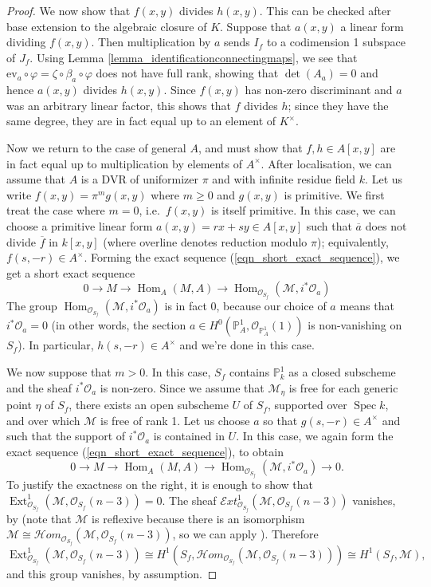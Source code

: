 \documentclass{article} %
\numberwithin{equation}{section}
\DeclareMathOperator{\Hom}{Hom}
\DeclareMathOperator{\Ext}{Ext}
\DeclareMathOperator{\Spec}{Spec}
\newcommand{\bbP}{\mathbb{P}}
\newcommand{\cO}{\mathcal{O}}
\newcommand{\cM}{\mathcal{M}}
\newcommand{\ShHom}{\mathcal{H}\!\mathit{om}}
\begin{document}
\begin{proof}
    We now show that $f(x, y)$ divides $h(x, y)$. This can be checked after base extension to the algebraic closure of $K$. Suppose that $a(x, y)$ a linear form dividing $f(x, y)$. Then multiplication by $a$ sends $I_f$ to a codimension 1 subspace of $J_f$. Using Lemma \ref{lemma_identificationconnectingmaps}, we see that $\mathrm{ev}_a \circ \varphi = \zeta \circ \beta_a \circ \varphi$ does not have full rank, showing that $\det(A_a) = 0$ and hence $a(x, y)$ divides $h(x, y)$. Since $f(x, y)$ has non-zero discriminant and $a$ was an arbitrary linear factor, this shows that $f$ divides $h$; since they have the same degree, they are in fact equal up to an element of $K^{\times}$.

    Now we return to the case of general $A$, and must show that $f, h \in A[x, y]$ are in fact equal up to multiplication by elements of $A^\times$. After localisation, we can assume that $A$ is a DVR of uniformizer $\pi$ and with infinite residue field $k$. Let us write $f(x, y) = \pi^m g(x, y)$ where $m \geq 0$ and $g(x, y)$ is primitive. We first treat the case where $m = 0$, i.e.\ $f(x, y)$ is itself primitive. In this case,  we can choose a primitive linear form $a(x, y) = r x + s y \in A[x, y]$ such that $\overline{a}$ does not divide $\overline{f}$ in $k[x, y]$ (where overline denotes reduction modulo $\pi$); equivalently, $f(s, -r) \in A^\times$. Forming the exact sequence (\ref{eqn_short_exact_sequence}), we get a short exact sequence
    \[ 0 \to M \to \Hom_A(M, A) \to \Hom_{\cO_{S_f}}(\cM, i^\ast \cO_a)  \]
    The group $\Hom_{\cO_{S_f}}(\cM, i^\ast \cO_a)$ is in fact $0$, because our choice of $a$ means that $i^\ast \cO_a = 0$ (in other words, the section $a \in H^0(\bbP^1_A, \cO_{\bbP^1_A}(1))$ is non-vanishing on $S_f$). In particular, $h(s, -r) \in A^\times$ and we're done in this case. 

    We now suppose that $m > 0$. In this case, $S_f$ contains $\bbP^1_k$ as a closed subscheme and the sheaf $i^\ast \cO_a$ is non-zero. Since we assume that $\cM_\eta$ is free for each generic point $\eta$ of $S_f$, there exists an open subscheme $U$ of $S_f$, supported over $\Spec k$, and over which $\cM$ is free of rank 1. Let us choose $a$ so that $g(s, -r) \in A^\times$ and such that the support of $i^\ast \cO_a$ is contained in $U$. In this case, we again form the exact sequence (\ref{eqn_short_exact_sequence}), to obtain 
    \[ 0 \to M \to \Hom_A(M, A) \to \Hom_{\cO_{S_f}}(\cM, i^\ast \cO_a) \to 0.  \]
    To justify the exactness on the right, it is enough to show that $\Ext^1_{\cO_{S_f}}(\cM, \cO_{S_f}(n-3)) = 0$. The sheaf $\mathcal{E}\mathit{xt}^1_{\cO_{S_f}}(\cM, \cO_{S_f}(n-3))$ vanishes, by \cite[Proposition 1.6]{Har92} (note that $\cM$ is reflexive because there is an isomorphism $\cM \cong \ShHom_{\cO_{S_f}}(\cM, \cO_{S_f}(n-3))$, so we can apply \cite[Corollary 1.8]{Har92}).
    Therefore
    \[\Ext^1_{\cO_{S_f}}(\cM, \cO_{S_f}(n-3)) \cong H^1(S_f, \ShHom_{\cO_{S_f}}(\cM, \cO_{S_f}(n-3))) \cong H^1(S_f, \cM), \]
    and this group vanishes, by assumption. 
    

\end{proof}
\end{document}
